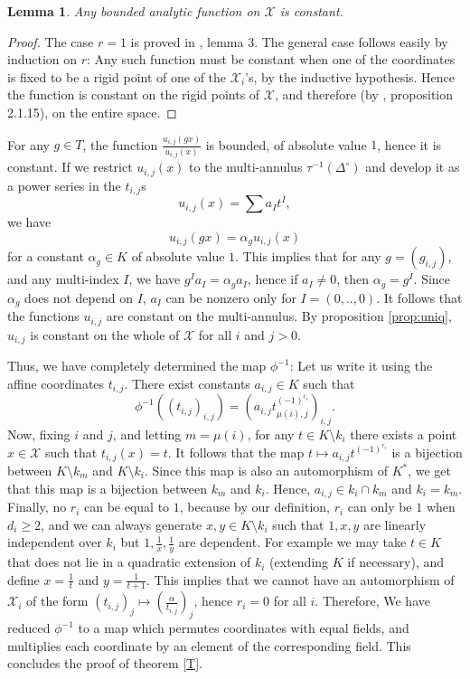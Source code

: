 \documentclass{amsart}
\theoremstyle{theorem}
\theoremstyle{lemma}
\newtheorem{lemma}{Lemma}[section]
\theoremstyle{prop}
\theoremstyle{definition}
\theoremstyle{corollary}
\theoremstyle{remark}
\newcommand{\X}{\mathcal{X}}
\begin{document}
\begin{lemma} Any bounded analytic function on $\X$ is constant. \end{lemma} \begin{proof} The case $r=1$ is proved in \cite{ber}, lemma 3. The general case follows easily by induction on $r$: Any such function must be constant when one of the coordinates is fixed to be a rigid point of one of the $\X_i$'s, by the inductive hypothesis. Hence the function is constant on the rigid points of $\X$, and therefore (by \cite{ber2}, proposition 2.1.15), on the entire space. \end{proof} 

For any $g\in T$, the function $\frac{u_{i,j}(gx)}{u_{i,j}(x)}$ is bounded, of absolute value $1$, hence it is constant. If we restrict $u_{i,j}(x)$ to the multi-annulus $\tau^{-1}(\Delta^{\circ})$ and develop it as a power series in the $t_{i,j}$s
$$ u_{i,j}(x) = \sum a_I t^I, $$ we have $$ u_{i,j}(gx) = \alpha_g u_{i,j}(x) $$ for a constant $\alpha_g\in K$ of absolute value $1$. This implies that for any $g=(g_{i,j})$, and any multi-index $I$, we have $g^I a_I = \alpha_g a_I$, hence if $a_I \neq 0$, then $\alpha_g = g^I$. Since $\alpha_g$ does not depend on $I$, $a_I$ can be nonzero only for $I=(0,..,0)$. It follows that the functions $u_{i,j}$ are constant on the multi-annulus. By proposition \ref{prop:uniq}, $u_{i,j}$ is constant on the whole of $\X$ for all $i$ and $j>0$.   

Thus, we have completely determined the map $\phi^{-1}$: Let us write it using the affine coordinates $t_{i,j}$. There exist constants $a_{i,j}\in K$ such that
$$\phi^{-1}((t_{i,j})_{i,j})=(a_{i,j}t_{\mu(i),j}^{(-1)^{r_i}})_{i,j}.$$
Now, fixing $i$ and $j$, and letting $m=\mu(i)$, for any $t\in K \setminus k_{i}$ there exists a point $x \in \X$ such that $t_{i,j}(x)=t$. It follows that the map $t \mapsto a_{i,j} t^{(-1)^{r_i}}$ is a bijection between $K \setminus k_m$ and $K \setminus k_i$. Since this map is also an automorphism of $K^*$, we get that this map is a bijection between $k_m$ and $k_i$. Hence, $a_{i,j} \in k_i \cap k_m$ and $k_i = k_m$. Finally, no $r_i$ can be equal to $1$,  because by our definition, $r_i$ can only be $1$ when $d_i \geq 2$, and we can always generate $x,y\in K \setminus k_i$ such that $1,x,y$ are linearly independent over $k_i$ but $1,\frac1x, \frac1y$ are dependent. For example we may take $t\in K$ that does not lie in a quadratic extension of $k_i$ (extending $K$ if necessary), and define $x=\frac1t$ and $y=\frac1{t+1}$. This implies that we cannot have an automorphism of $\X_i$ of the form $(t_{i,j})_j \mapsto (\frac{\alpha}{t_{i,j}})_j$, hence $r_i=0$ for all $i$. Therefore, We have reduced $\phi^{-1}$ to a map which permutes coordinates with equal fields, and multiplies each coordinate by an element of the corresponding field. This concludes the proof of theorem \ref{T}.
\end{document}
